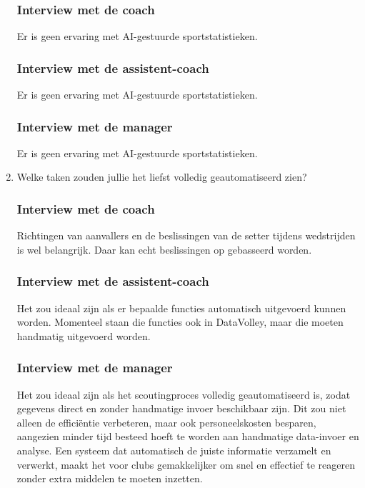 \begin{enumerate}
  \subsubsection{Interview met de coach}
  Er is geen ervaring met AI-gestuurde sportstatistieken.
  \subsubsection{Interview met de assistent-coach}
  Er is geen ervaring met AI-gestuurde sportstatistieken.
  \subsubsection{Interview met de manager}
  Er is geen ervaring met AI-gestuurde sportstatistieken.
  \item Welke taken zouden jullie het liefst volledig geautomatiseerd zien?
  \subsubsection{Interview met de coach}
  Richtingen van aanvallers en de beslissingen van de setter tijdens wedstrijden is wel belangrijk. Daar kan echt beslissingen op gebasseerd worden. 
  \subsubsection{Interview met de assistent-coach}
  Het zou ideaal zijn als er bepaalde functies automatisch uitgevoerd kunnen worden. Momenteel staan die functies ook in DataVolley, maar die moeten handmatig uitgevoerd worden.
  \subsubsection{Interview met de manager}
  Het zou ideaal zijn als het scoutingproces volledig geautomatiseerd is, zodat gegevens direct en zonder handmatige invoer beschikbaar zijn. Dit zou niet alleen de efficiëntie verbeteren, maar ook personeelskosten besparen, aangezien minder tijd besteed hoeft te worden aan handmatige data-invoer en analyse. Een systeem dat automatisch de juiste informatie verzamelt en verwerkt, maakt het voor clubs gemakkelijker om snel en effectief te reageren zonder extra middelen te moeten inzetten.
\end{enumerate}


